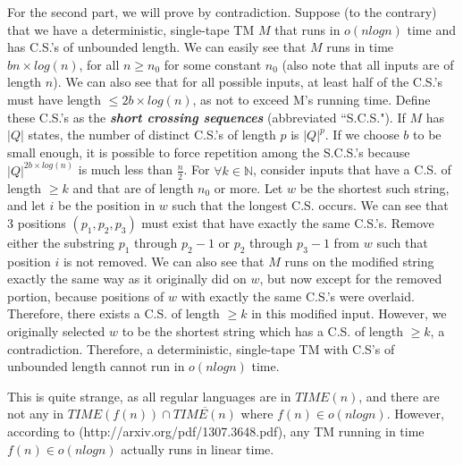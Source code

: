 \begin{enumerate}
\par For the second part, we will prove by contradiction. Suppose (to the contrary) that we have a deterministic, single-tape TM $M$ that runs in $o(n log n)$ time and has C.S.'s of unbounded length. We can easily see that $M$ runs in time $bn \times log(n)$, for all $n \ge n_0$ for some constant $n_0$ (also note that all inputs are of length $n$). We can also see that for all possible inputs, at least half of the C.S.'s must have length $\le 2b \times log(n)$, as not to exceed M's running time. Define these C.S.'s as the \textbf{\emph{short crossing sequences}} (abbreviated ``S.C.S."). If $M$ has $|Q|$ states, the number of distinct C.S.'s of length $p$ is $|Q|^p$. If we choose $b$ to be small enough, it is possible to force repetition among the S.C.S.'s because $|Q|^{2b\times log(n)}$ is much less than $\frac{n}{2}$. For $\forall k \in \mathbb{N}$, consider inputs that have a C.S. of length $\ge k$ and that are of length $n_0$ or more. Let $w$ be the shortest such string, and let $i$ be the position in $w$ such that the longest C.S. occurs. We can see that 3 positions $(p_1, p_2, p_3)$ must exist that have exactly the same C.S.'s. Remove either the substring $p_1$ through $p_2-1$ or $p_2$ through $p_3-1$ from $w$ such that position $i$ is not removed. We can also see that $M$ runs on the modified string exactly the same way as it originally did on $w$, but now except for the removed portion, because positions of $w$ with exactly the same C.S.'s were overlaid. Therefore, there exists a C.S. of length $\ge k$ in this modified input. However, we originally selected $w$ to be the shortest string which has a C.S. of length $\ge k$, a contradiction. Therefore, a deterministic, single-tape TM with C.S's of unbounded length cannot run in $o(n log n)$ time.

\par This is quite strange, as all regular languages are in $TIME(n)$, and there are not any in $TIME(f(n)) \cap \overline{TIME(n)}$ where $f(n) \in o(n log n)$. However, according to (http://arxiv.org/pdf/1307.3648.pdf), any TM running in time $f(n) \in o(n log n)$ actually runs in linear time.

\end{enumerate}